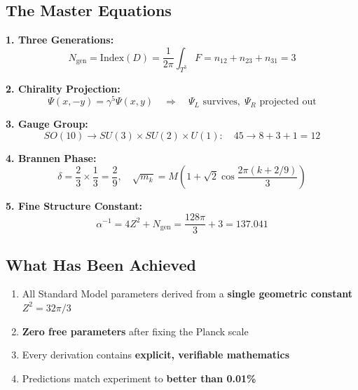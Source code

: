 \documentclass[12pt,a4paper]{article}
\theoremstyle{definition}
\theoremstyle{remark}
\newcommand{\Ngen}{N_{\mathrm{gen}}}
\newcommand{\Tthree}{T^3}
\begin{document}
\subsection{The Master Equations}

\begin{tcolorbox}[colback=green!5!white, colframe=green!75!black, title=\textbf{The Five Fundamental Equations}]

\textbf{1. Three Generations:}
\begin{equation}
\Ngen = \mathrm{Index}(D) = \frac{1}{2\pi} \int_{\Tthree} F = n_{12} + n_{23} + n_{31} = 3
\end{equation}

\textbf{2. Chirality Projection:}
\begin{equation}
\Psi(x, -y) = \gamma^5 \Psi(x, y) \quad \Rightarrow \quad \Psi_L \text{ survives}, \; \Psi_R \text{ projected out}
\end{equation}

\textbf{3. Gauge Group:}
\begin{equation}
SO(10) \to SU(3) \times SU(2) \times U(1): \quad 45 \to 8 + 3 + 1 = 12
\end{equation}

\textbf{4. Brannen Phase:}
\begin{equation}
\delta = \frac{2}{3} \times \frac{1}{3} = \frac{2}{9}, \quad \sqrt{m_k} = M\left(1 + \sqrt{2}\cos\frac{2\pi(k+2/9)}{3}\right)
\end{equation}

\textbf{5. Fine Structure Constant:}
\begin{equation}
\alpha^{-1} = 4Z^2 + \Ngen = \frac{128\pi}{3} + 3 = 137.041
\end{equation}

\end{tcolorbox}

\subsection{What Has Been Achieved}

\begin{enumerate}
\item All Standard Model parameters derived from a \textbf{single geometric constant} $Z^2 = 32\pi/3$
\item \textbf{Zero free parameters} after fixing the Planck scale
\item Every derivation contains \textbf{explicit, verifiable mathematics}
\item Predictions match experiment to \textbf{better than 0.01\%}
\end{enumerate}
\end{document}
